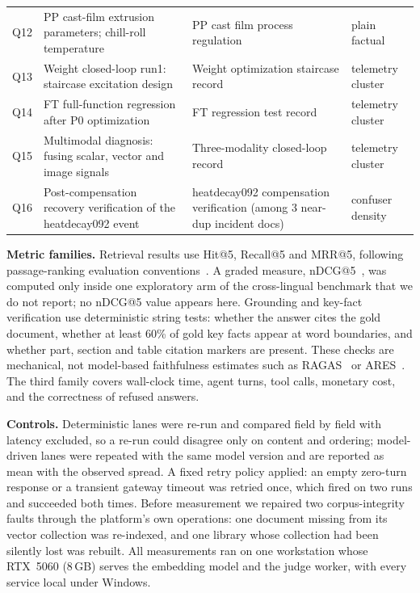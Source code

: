 \begin{table}[!htbp]
\begin{tabular}{lp{5.3cm}p{4.0cm}p{2.8cm}}
Q12 & PP cast-film extrusion parameters; chill-roll temperature & PP cast
film process regulation & plain factual \\
Q13 & Weight closed-loop run1: staircase excitation design & Weight
optimization staircase record & telemetry cluster \\
Q14 & FT full-function regression after P0 optimization & FT regression test
record & telemetry cluster \\
Q15 & Multimodal diagnosis: fusing scalar, vector and image signals &
Three-modality closed-loop record & telemetry cluster \\
Q16 & Post-compensation recovery verification of the heatdecay092 event &
heatdecay092 compensation verification (among 3 near-dup incident docs) &
confuser density \\
\bottomrule
\end{tabular}
\end{table}

\textbf{Metric families.} Retrieval results use Hit@5, Recall@5 and MRR@5, following passage-ranking evaluation conventions~\cite{craswell-msmarco-2021}. A graded measure, nDCG@5~\cite{jarvelin-cumulated-gain-2002}, was computed only inside one exploratory arm of the cross-lingual benchmark that we do not report; no nDCG@5 value appears here. Grounding and key-fact verification use deterministic string tests: whether the answer cites the gold document, whether at least 60\% of gold key facts appear at word boundaries, and whether part, section and table citation markers are present. These checks are mechanical, not model-based faithfulness estimates such as RAGAS~\cite{es-ragas-2024} or ARES~\cite{saad-falcon-ares-2024}. The third family covers wall-clock time, agent turns, tool calls, monetary cost, and the correctness of refused answers.

\textbf{Controls.} Deterministic lanes were re-run and compared field by field with latency excluded, so a re-run could disagree only on content and ordering; model-driven lanes were repeated with the same model version and are reported as mean with the observed spread. A fixed retry policy applied: an empty zero-turn response or a transient gateway timeout was retried once, which fired on two runs and succeeded both times. Before measurement we repaired two corpus-integrity faults through the platform's own operations: one document missing from its vector collection was re-indexed, and one library whose collection had been silently lost was rebuilt. All measurements ran on one workstation whose RTX~5060 (8\,GB) serves the embedding model and the judge worker, with every service local under Windows.

